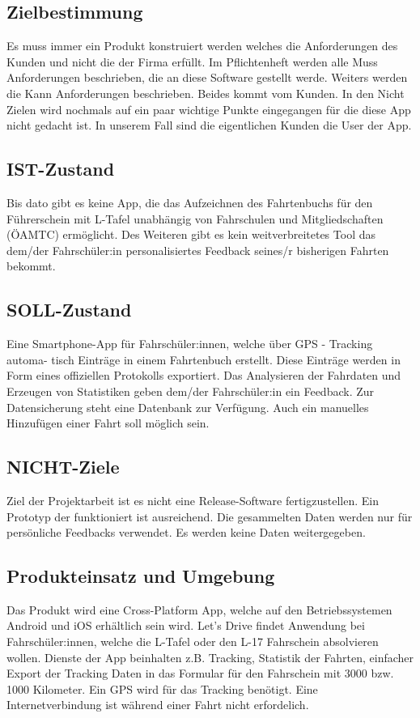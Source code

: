 \subsection{Zielbestimmung}
Es muss immer ein Produkt konstruiert werden welches die Anforderungen des Kunden und nicht die der Firma erfüllt. Im Pflichtenheft werden alle Muss Anforderungen beschrieben, die an diese Software gestellt werde. Weiters werden die Kann Anforderungen beschrieben. Beides kommt vom Kunden. In den Nicht Zielen wird nochmals auf ein paar wichtige Punkte eingegangen für die diese App nicht gedacht ist. In unserem Fall sind die eigentlichen Kunden die User der App.

\subsection{IST-Zustand}
Bis dato gibt es keine App, die das Aufzeichnen des Fahrtenbuchs für den Führerschein mit L-Tafel unabhängig von Fahrschulen und Mitgliedschaften (ÖAMTC) ermöglicht. Des Weiteren gibt es kein weitverbreitetes Tool das dem/der Fahrschüler:in personalisiertes Feedback seines/r bisherigen Fahrten bekommt.

\subsection{SOLL-Zustand}
Eine Smartphone-App für Fahrschüler:innen, welche über GPS - Tracking automa-
tisch Einträge in einem Fahrtenbuch erstellt. Diese Einträge werden in Form eines
offiziellen Protokolls exportiert. Das Analysieren der Fahrdaten und Erzeugen von
Statistiken geben dem/der Fahrschüler:in ein Feedback. Zur Datensicherung steht
eine Datenbank zur Verfügung. Auch ein manuelles Hinzufügen einer Fahrt soll möglich sein.

\subsection{NICHT-Ziele}
Ziel der Projektarbeit ist es nicht eine Release-Software fertigzustellen. Ein Prototyp der funktioniert ist ausreichend. Die gesammelten Daten werden nur für persönliche Feedbacks verwendet. Es werden keine Daten weitergegeben.

\subsection{Produkteinsatz und Umgebung}

	Das Produkt wird eine Cross-Platform App, welche auf den Betriebssystemen Android und iOS erhältlich sein wird. Let's Drive findet Anwendung bei Fahrschüler:innen, welche die L-Tafel oder den L-17 Fahrschein absolvieren wollen. Dienste der App beinhalten z.B. Tracking, Statistik der Fahrten, einfacher Export der Tracking Daten in das Formular für den Fahrschein mit 3000 bzw. 1000 Kilometer. Ein GPS wird für das Tracking benötigt. Eine Internetverbindung ist während einer Fahrt nicht erfordelich.

